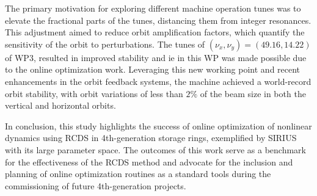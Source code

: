 The primary motivation for exploring different machine operation tunes was to elevate the fractional parts of the tunes, distancing them from integer resonances. This adjustment aimed to reduce orbit amplification factors, which quantify the sensitivity of the orbit to perturbations. The tunes of $(\nu_x, \nu_y) = (49.16, 14.22)$ of \gls*{WP3}, resulted in improved stability and \gls*{ie} in this WP was made possible due to the online optimization work. Leveraging this new working point and recent enhancements in the orbit feedback systems, the machine achieved a world-record orbit stability, with  orbit variations of less than $2\%$ of the beam size in both the vertical and horizontal orbits.

In conclusion, this study highlights the success of online optimization of nonlinear dynamics using \gls*{RCDS} in 4th-generation storage rings, exemplified by SIRIUS with its large parameter space. The outcomes of this work serve as a benchmark for the effectiveness of the \gls*{RCDS} method and advocate for the inclusion and planning of online optimization routines as a standard tools during the commissioning of future 4th-generation projects.
